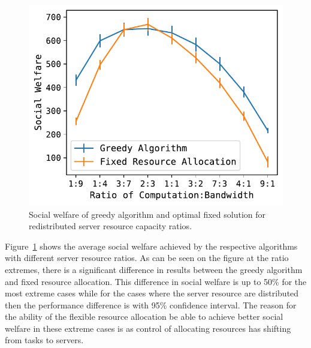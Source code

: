 \begin{figure}[ht]
    \centering
    \includegraphics[width=\linewidth]{figs/resource_ratio/social_welfare.pdf}
    \caption{Social welfare of greedy algorithm and optimal fixed solution for redistributed server resource capacity ratios.}
    \label{fig:resource-ratio-social-welfare}
\end{figure}

Figure~\ref{fig:resource-ratio-social-welfare} shows the average social welfare achieved by the respective algorithms with different server resource ratios. As can be seen on the figure at the ratio extremes, there is a significant difference in results between the greedy algorithm and fixed resource allocation. This difference in social welfare is up to 50\% for the most extreme cases while for the cases where the server resource are distributed then the performance difference is with 95\% confidence interval. The reason for the ability of the flexible resource allocation be able to achieve better social welfare in these extreme cases is as control of allocating resources has shifting from tasks to servers. 